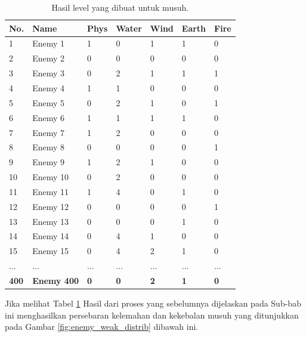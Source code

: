 \begin{table}[!h]
	\centering
	\caption{Hasil level yang dibuat untuk musuh.}
	\label{tb:enemy_weak_distrib}
	\begin{tabular}{|l|l|l|l|l|l|l|}
		\hline
		\textbf{No.} & \textbf{Name} & \textbf{Phys} & \textbf{Water} & \textbf{Wind} & \textbf{Earth} & \textbf{Fire} \\ \hline
		1 & Enemy 1 & 1 & 0 & 1 & 1 & 0 \\ \hline
		2 & Enemy 2 & 0 & 0 & 0 & 0 & 0 \\ \hline
		3 & Enemy 3 & 0 & 2 & 1 & 1 & 1 \\ \hline
		4 & Enemy 4 & 1 & 1 & 0 & 0 & 0 \\ \hline
		5 & Enemy 5 & 0 & 2 & 1 & 0 & 1 \\ \hline
		6 & Enemy 6 & 1 & 1 & 1 & 1 & 0 \\ \hline
		7 & Enemy 7 & 1 & 2 & 0 & 0 & 0 \\ \hline
		8 & Enemy 8 & 0 & 0 & 0 & 0 & 1 \\ \hline
		9 & Enemy 9 & 1 & 2 & 1 & 0 & 0 \\ \hline
		10 & Enemy 10 & 0 & 2 & 0 & 0 & 0 \\ \hline
		11 & Enemy 11 & 1 & 4 & 0 & 1 & 0 \\ \hline
		12 & Enemy 12 & 0 & 0 & 0 & 0 & 1 \\ \hline
		13 & Enemy 13 & 0 & 0 & 0 & 1 & 0 \\ \hline
		14 & Enemy 14 & 0 & 4 & 1 & 0 & 0 \\ \hline
		15 & Enemy 15 & 0 & 4 & 2 & 1 & 0 \\ \hline
		... & ... & ... & ... & ... & ... & ... \\ \hline
		\textbf{400} & \textbf{Enemy 400} & \textbf{0} & \textbf{0} & \textbf{2} & \textbf{1} & \textbf{0} \\ \hline
	\end{tabular}
\end{table}
\vspace{1ex}

Jika melihat Tabel \ref{tb:enemy_weak_distrib} Hasil dari proses yang sebelumnya dijelaskan pada Sub-bab ini menghasilkan persebaran kelemahan dan kekebalan musuh yang ditunjukkan pada Gambar \ref{fig:enemy_weak_distrib} dibawah ini.

